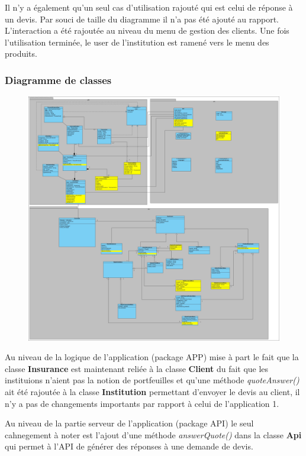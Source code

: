 \documentclass[../rapport.tex]{subfiles}
\begin{document}
		Il n'y a également qu'un seul cas d'utilisation rajouté qui est celui de réponse à un
		devis. Par souci de taille du diagramme il n'a pas été ajouté au rapport. L'interaction
		a été rajoutée au niveau du menu de gestion des clients. Une fois l'utilisation terminée,
		le user de l'institution est ramené vers le menu des produits.

		\subsubsection{Diagramme de classes}

				\begin{figure}[h]
						\centering\includegraphics[scale=0.15]{ressources/photos_diagrammes/extensionThomas/classes2Thomas.jpg}
				\end{figure}
		Au niveau de la logique de l'application (package APP) mise à part le fait que la classe 
		\textbf{Insurance} est maintenant reliée à la classe \textbf{Client} du fait que les 
		instituions n'aient pas la notion de portfeuilles et qu'une méthode \textit{quoteAnswer()}
		ait été rajoutée à la classe \textbf{Institution} permettant d'envoyer le devis au client,
		il n'y a pas de changements importants par rapport à celui de l'application 1. 

		\bigskip

		Au niveau de la partie serveur de l'application (package API) le seul cahnegement à noter
		est l'ajout d'une méthode \textit{answerQuote()} dans la classe \textbf{Api} qui permet
		à l'API de générer des réponses à une demande de devis.
\end{document}
